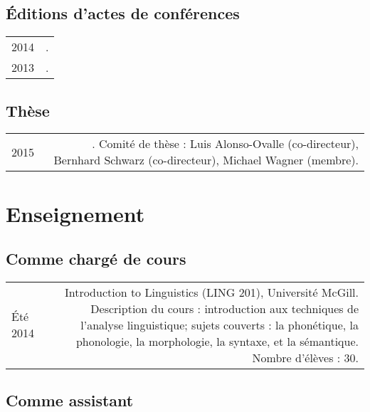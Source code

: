 \documentclass[11pt,a4paper,twoside,french]{article}
\makeatletter
\newcommand{\bodywidth}{0.75}
\newenvironment{cvsection}{%
  \setlength{\extrarowheight}{0.70ex}
  \begin{longtable}[l]{@{} L R @{}}
}{%
  \end{longtable}
}
\newcommand{\course}[3]{%
  \parbox[t]{\bodywidth\textwidth}{#1.\\ {\footnotesize Description du cours : #2.
      Nombre d'élèves : #3.}}
}
\makeatother
\begin{document}
\subsection*{Éditions d'actes de conférences}

\begin{cvsection}
  2014 & .\\
  2013 & .\\
\end{cvsection}

\subsection*{Thèse}

\begin{cvsection}
  2015 & . Comité de thèse : Luis Alonso-Ovalle (co-directeur), Bernhard Schwarz (co-directeur), Michael Wagner (membre).\\
\end{cvsection}

\section*{Enseignement}

\subsection*{Comme chargé de cours}

\begin{cvsection}
  Été 2014 & \course{Introduction to Linguistics (LING 201), Université McGill}
  {introduction aux techniques de l'analyse linguistique; sujets couverts : la phonétique, la phonologie, la morphologie, la syntaxe, et la sémantique}
  {30}
\end{cvsection}

\subsection*{Comme assistant}
\end{document}
